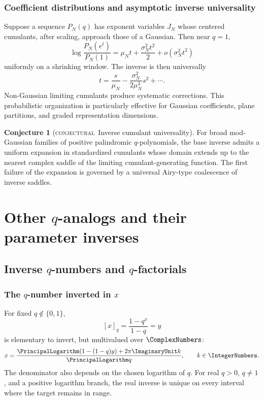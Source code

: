 \documentclass[11pt,letterpaper,oneside,openany]{book}
\theoremstyle{definition}
\newtheorem{conjecture}[theorem]{Conjecture}
\theoremstyle{remark}
\newcommand{\statusconjectural}{\textcolor{conjectureorange}{\textsc{conjectural}}}
\begin{document}
\section{Coefficient distributions and asymptotic inverse universality}
Suppose a sequence \(P_N(q)\) has exponent variables \(J_N\) whose centered
cumulants, after scaling, approach those of a Gaussian.  Then near \(q=1\),
\[
 \log\frac{P_N(e^t)}{P_N(1)}
 =\mu_Nt+\frac{\sigma_N^2t^2}{2}+o(\sigma_N^2t^2)
\]
uniformly on a shrinking window.  The inverse is then universally
\[
 t=\frac{s}{\mu_N}-\frac{\sigma_N^2}{2\mu_N^3}s^2+\cdots.
\]
Non-Gaussian limiting cumulants produce systematic corrections.  This
probabilistic organization is particularly effective for Gaussian
coefficients, plane partitions, and graded representation dimensions.

\begin{conjecture}[\statusconjectural\ Inverse cumulant universality]
For broad mod-Gaussian families of positive palindromic \(q\)-polynomials, the
base inverse admits a uniform expansion in standardized cumulants whose domain
extends up to the nearest complex saddle of the limiting cumulant-generating
function.  The first failure of the expansion is governed by a universal
Airy-type coalescence of inverse saddles.
\end{conjecture}

\part{Other \texorpdfstring{\(q\)}{q}-analogs and their parameter inverses}

\chapter{Inverse \texorpdfstring{\(q\)}{q}-numbers and \texorpdfstring{\(q\)}{q}-factorials}

\section{The \texorpdfstring{\(q\)}{q}-number inverted in \texorpdfstring{\(x\)}{x}}
For fixed \(q\notin\{0,1\}\),
\[
 [x]_q=\frac{1-q^x}{1-q}=y
\]
is elementary to invert, but multivalued over \(\ComplexNumbers\):
\begin{equation}\label{eq:qnumber-x-inverse}
 x=\frac{\PrincipalLogarithm(1-(1-q)y)+2\pi\ImaginaryUnit k}{\PrincipalLogarithm q},
 \qquad k\in\IntegerNumbers.
\end{equation}
The denominator also depends on the chosen logarithm of \(q\).  For real
\(q>0\), \(q\ne1\), and a positive logarithm branch, the real inverse is
unique on every interval where the target remains in range.
\end{document}
